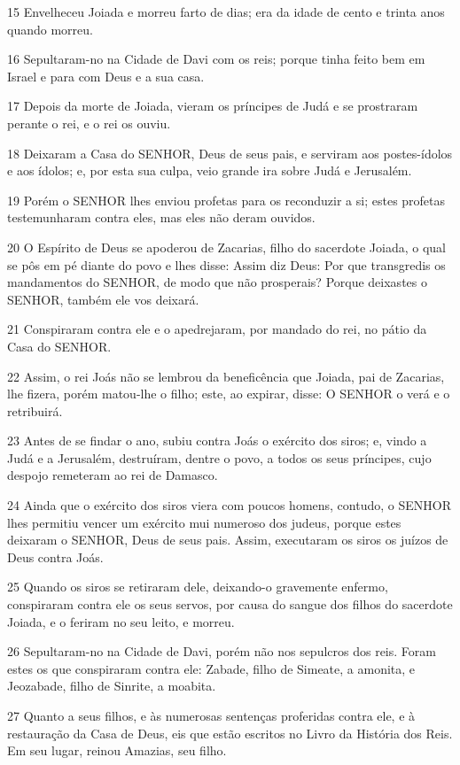 \par 15 Envelheceu Joiada e morreu farto de dias; era da idade de cento e trinta anos quando morreu.
\par 16 Sepultaram-no na Cidade de Davi com os reis; porque tinha feito bem em Israel e para com Deus e a sua casa.
\par 17 Depois da morte de Joiada, vieram os príncipes de Judá e se prostraram perante o rei, e o rei os ouviu.
\par 18 Deixaram a Casa do SENHOR, Deus de seus pais, e serviram aos postes-ídolos e aos ídolos; e, por esta sua culpa, veio grande ira sobre Judá e Jerusalém.
\par 19 Porém o SENHOR lhes enviou profetas para os reconduzir a si; estes profetas testemunharam contra eles, mas eles não deram ouvidos.
\par 20 O Espírito de Deus se apoderou de Zacarias, filho do sacerdote Joiada, o qual se pôs em pé diante do povo e lhes disse: Assim diz Deus: Por que transgredis os mandamentos do SENHOR, de modo que não prosperais? Porque deixastes o SENHOR, também ele vos deixará.
\par 21 Conspiraram contra ele e o apedrejaram, por mandado do rei, no pátio da Casa do SENHOR.
\par 22 Assim, o rei Joás não se lembrou da beneficência que Joiada, pai de Zacarias, lhe fizera, porém matou-lhe o filho; este, ao expirar, disse: O SENHOR o verá e o retribuirá.
\par 23 Antes de se findar o ano, subiu contra Joás o exército dos siros; e, vindo a Judá e a Jerusalém, destruíram, dentre o povo, a todos os seus príncipes, cujo despojo remeteram ao rei de Damasco.
\par 24 Ainda que o exército dos siros viera com poucos homens, contudo, o SENHOR lhes permitiu vencer um exército mui numeroso dos judeus, porque estes deixaram o SENHOR, Deus de seus pais. Assim, executaram os siros os juízos de Deus contra Joás.
\par 25 Quando os siros se retiraram dele, deixando-o gravemente enfermo, conspiraram contra ele os seus servos, por causa do sangue dos filhos do sacerdote Joiada, e o feriram no seu leito, e morreu.
\par 26 Sepultaram-no na Cidade de Davi, porém não nos sepulcros dos reis. Foram estes os que conspiraram contra ele: Zabade, filho de Simeate, a amonita, e Jeozabade, filho de Sinrite, a moabita.
\par 27 Quanto a seus filhos, e às numerosas sentenças proferidas contra ele, e à restauração da Casa de Deus, eis que estão escritos no Livro da História dos Reis. Em seu lugar, reinou Amazias, seu filho.

